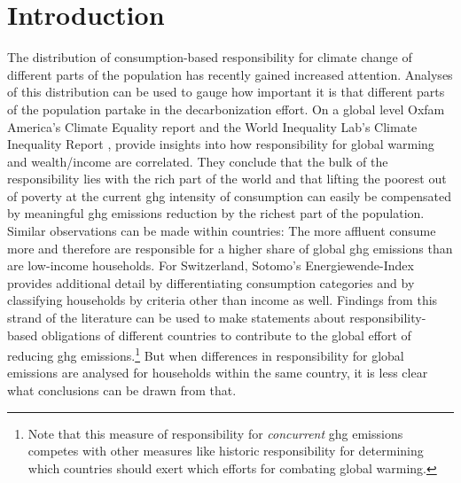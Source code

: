\documentclass[referee, lineno, pdflatex,sn-apa]{sn-jnl}%
\theoremstyle{thmstyleone}%
\theoremstyle{thmstyletwo}%
\theoremstyle{thmstylethree}%
\begin{document}


\maketitle

\section{Introduction}
\label{sec:intro}

The distribution of consumption-based responsibility for climate change of different parts of the population has recently gained increased attention.
Analyses of this distribution can be used to gauge how important it is that different parts of the population partake in the decarbonization effort.
On a global level Oxfam America's Climate Equality report \citep{khalfan_climate_2023} and the World Inequality Lab's Climate Inequality Report \citep{chancel_climate_2023}, provide insights into how responsibility for global warming and wealth/income are correlated.
They conclude that the bulk of the responsibility lies with the rich part of the world and that lifting the poorest out of poverty at the current \ac{ghg} intensity of consumption can easily be compensated by meaningful \ac{ghg} emissions reduction by the richest part of the population.
Similar observations can be made within countries:
The more affluent consume more and therefore are responsible for a higher share of global \ac{ghg} emissions than are low-income households.
For Switzerland, Sotomo's Energiewende-Index \citep{stuckelberger_helion_2024} provides additional detail by differentiating consumption categories and by classifying households by criteria other than income as well.
Findings from this strand of the literature can be used to make statements about responsibility-based obligations of different countries to contribute to the global effort of reducing \ac{ghg} emissions.\footnote{%
Note that this measure of responsibility for \emph{concurrent} \ac{ghg} emissions competes with other measures like historic responsibility for determining which countries should exert which efforts for combating global warming.
}
But when differences in responsibility for global emissions are analysed for households within the same country, it is less clear what conclusions can be drawn from that.
\end{document}
